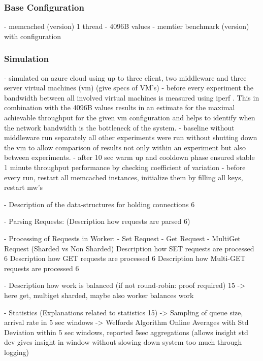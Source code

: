\documentclass[11pt,a4paper]{article}
\begin{document}
\subsubsection{Base Configuration}
- memcached (version) 1 thread
- 4096B values
- memtier benchmark (version) with configuration
\subsubsection{Simulation}\label{simulation}
- simulated on azure cloud using up to three client, two middleware and three server virtual machines (vm) (give specs of VM's)
- before every experiment the bandwidth between all involved virtual machines is measured using iperf . This in combination with the 4096B values results in an estimate for the maximal achievable throughput for the given vm configuration and helps to identify when the network bandwidth is the bottleneck of the system.
- baseline without middleware run separately all other experiments were run without shutting down the vm to allow comparison of results not only within an experiment but also between experiments.
- after 10 sec warm up and cooldown phase ensured stable 1 minute throughput performance by checking coefficient of variation
- before every run, restart all memcached instances, initialize them by filling all keys, restart mw's



- Description of the data-structures for holding connections 6 

- Parsing Requests: 
(Description how requests are parsed 6)

- Processing of Requests in Worker:
- Set Request
- Get Request
- MultiGet Request (Sharded vs Non Sharded)
Description how SET requests are processed 6 Description how GET requests are processed 6 Description how Multi-GET requests are processed 6 

- Description how work is balanced (if not round-robin: proof required) 15 
-> here get, multiget sharded, maybe also worker balances work

- Statistics (Explanations related to statistics 15)
-> Sampling of queue size, arrival rate in 5 sec windows
-> Welfords Algorithm Online Averages with Std Deviation within 5 sec windows, reported 5sec aggregations (allows insight std dev gives insight in window without slowing down system too much through logging)
\end{document}
